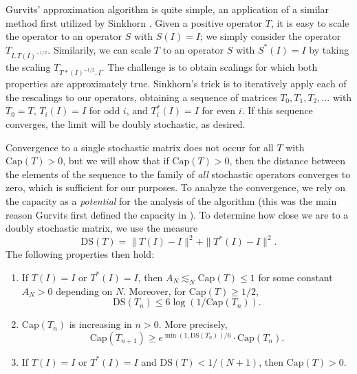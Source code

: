 \documentclass[12pt]{article}
\begin{document}
Gurvits' approximation algorithm is quite simple, an application of a similar method first utilized by Sinkhorn \cite{sinkhorn}. Given a positive operator $T$, it is easy to scale the operator to an operator $S$ with $S(I) = I$; we simply consider the operator $T_{I, T(I)^{-1/2}}$. Similarily, we can scale $T$ to an operator $S$ with $S^*(I) = I$ by taking the scaling $T_{T*(I)^{-1/2}, I}$. The challenge is to obtain scalings for which both properties are approximately true. Sinkhorn's trick is to iteratively apply each of the rescalings to our operators, obtaining a sequence of matrices $T_0, T_1, T_2, \dots$ with $T_0 = T$, $T_i(I) = I$ for odd $i$, and $T_i^*(I) = I$ for even $i$. If this sequence converges, the limit will be doubly stochastic, as desired.

Convergence to a single stochastic matrix does not occur for all $T$ with $\text{Cap}(T) > 0$, but we will show that if $\text{Cap}(T) > 0$, then the distance between the elements of the sequence to the family of \emph{all} stochastic operators converges to zero, which is sufficient for our purposes. To analyze the convergence, we rely on the capacity as a \emph{potential} for the analysis of the algorithm (this was the main reason Gurvits first defined the capacity in \cite{gurv2004}). To determine how close we are to a doubly stochastic matrix, we use the measure
%
\[ \text{DS}(T) = \| T(I) - I \|^2 + \| T^*(I) - I \|^2. \]
%
The following properties then hold:
%
\begin{enumerate}
        \item If $T(I) = I$ or $T^*(I) = I$, then $A_N \lesssim_N \text{Cap}(T) \leq 1$ for some constant $A_N > 0$ depending on $N$. Moreover, for $\text{Cap}(T) \geq 1/2$,
        \[ \text{DS}(T_n) \leq 6 \log(1/\text{Cap}(T_n)). \]

        \item $\text{Cap}(T_n)$ is increasing in $n > 0$. More precisely,
        \[ \text{Cap}(T_{n+1}) \geq e^{\min(1,\text{DS}(T_n))/6} \cdot \text{Cap}(T_n). \]

        \item If $T(I) = I$ or $T^*(I) = I$ and $\text{DS}(T) < 1/(N+1)$, then $\text{Cap}(T) > 0$.
\end{enumerate}
\end{document}
